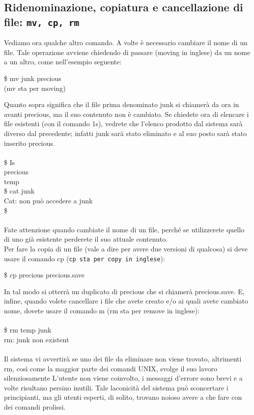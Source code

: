  \subsection{Ridenominazione, copiatura e cancellazione di file: {\tt mv, cp, rm}}
  Vediamo ora qualche altro comando. A volte è necessario cambiare il nome di un file.
  Tale operazione avviene chiedendo di passare (moving in inglese) da un nome a un
  altro, come nell'esempio seguente:
  \begin{multicols}{2}
  	\$ mv junk precious\\
  	(mv sta per moving)
  \end{multicols}
Quanto sopra significa che il file prima denominato junk si chiamerà da ora in avanti
precious, ma il suo contenuto non è cambiato. Se chiedete ora di elencare i file esistenti
(con il comando 1s), vedrete che l'elenco prodotto dal sistema sarà diverso dal precedente;
infatti junk sarà stato eliminato e al suo posto sarà stato inserito precious.\\\\
\$ Is\\
precious\\
temp\\
\$ cat junk\\
Cat: non può accedere a junk\\
\$\\\\
Fate attenzione quando cambiate il nome di un file, perché se utilizzerete quello di
uno già esistente perderete il suo attuale contenuto.\\
Per fare la copia di un file (vale a dire per avere due versioni di qualcosa) si deve
usare il comando cp ({\tt cp sta per copy in inglese}):
\begin{multicols}{2}
	\$ cp precious precious.save
\end{multicols}
In tal modo si otterrà un duplicato di precious che si chiamerà precious.save.
E, infine, quando volete cancellare i file che avete creato e/o ai quali avete cambiato nome,
dovete usare il comando m (rm sta per remove in inglese):\\\\
\$ rm temp junk\\
rm: junk non existent\\\\
Il sistema vi avvertirà se uno dei file da eliminare non viene trovato, altrimenti rm, così
come la maggior parte dei comandi UNIX, svolge il suo lavoro silenziosamente
L'utente non viene coinvolto, i messaggi d'errore sono brevi e a volte risultano persino
inutili. Tale laconicità del sistema può sconcertare i principianti, ma gli utenti
esperti, di solito, trovano noioso avere a che fare con dei comandi prolissi.
